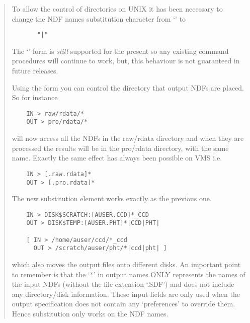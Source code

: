 \begin{itemize}
\begin{quote}
    To allow the control of directories on UNIX it has been necessary
    to change the NDF names substitution character from `\myverb{/}'
    to 
    \begin{myquote}
    \begin{verbatim}
       "|"
    \end{verbatim}
    \end{myquote}

    The `\myverb{/}' form is {\em still} supported for the present
    so any existing command procedures will continue to work, but, this
    behaviour is not guaranteed in future releases. 

    Using the  form you can control the directory that
    output NDFs are placed. So for instance
    \begin{myquote}
    \begin{verbatim}
    IN > raw/rdata/*
    OUT > pro/rdata/*
    \end{verbatim}
    \end{myquote}

    will now access all the NDFs in the raw/rdata directory and when 
    they are processed the results will be in the pro/rdata directory,
    with the same name. Exactly the same effect has always been 
    possible on VMS i.e.
    \begin{myquote}
    \begin{verbatim}
    IN > [.raw.rdata]*
    OUT > [.pro.rdata]*
    \end{verbatim}
    \end{myquote}

    The new substitution element works exactly as the previous one.
    \begin{myquote}
    \begin{verbatim}
    IN > DISK$SCRATCH:[AUSER.CCD]*_CCD
    OUT > DISK$TEMP:[AUSER.PHT]*|CCD|PHT|

    [ IN > /home/auser/ccd/*_ccd
      OUT > /scratch/auser/pht/*|ccd|pht| ]
    \end{verbatim}
    \end{myquote}

    which also moves the output files onto different disks. An important
    point to remember is that the `*' in output names ONLY represents
    the names of the input NDFs (without the file extension `.SDF')
    and does not include any directory/disk information. These input 
    fields are only used when the output specification does not contain
    any `preferences' to override them. Hence substitution only works
    on the NDF names.


\end{quote}
\end{itemize}
